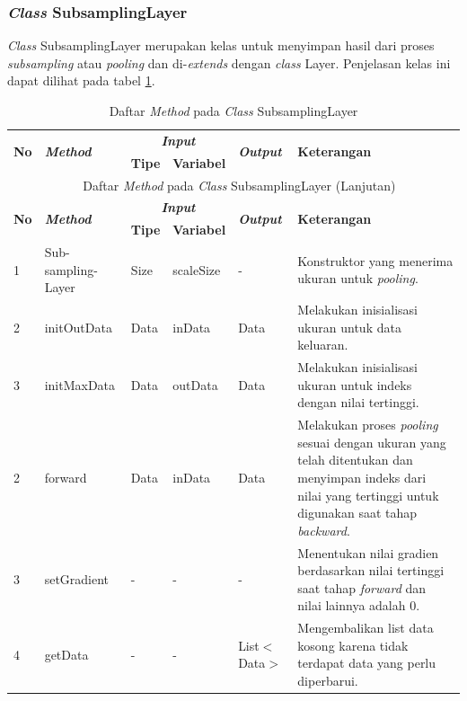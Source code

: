 \subsubsection{\textit{Class} SubsamplingLayer}
\noindent \textit{Class} SubsamplingLayer merupakan kelas untuk menyimpan hasil dari proses \textit{subsampling} atau \textit{pooling} dan di-\textit{extends} dengan \textit{class} Layer. Penjelasan kelas ini dapat dilihat pada tabel \ref{tbl:classSubsamplingLayer}.
\begingroup
\setlength{\LTleft}{-20cm plus -1fill}
\setlength{\LTright}{\LTleft}
\begin{small}
\begin{longtable}{|p{0.4cm}|p{2cm}|p{1.8cm}|p{1.8cm}|p{1.7cm}|p{3.55cm}|}
	\caption{Daftar \textit{Method} pada \textit{Class} SubsamplingLayer \label{tbl:classSubsamplingLayer}}\\
	\hline
	\multirow{2}{*}{\textbf{No}} & \multirow{2}{*}{\textit{\textbf{Method}}} & \multicolumn{2}{c|}{\textit{\textbf{Input}}} & \multirow{2}{*}{\textit{\textbf{Output}}} & 
	\multirow{2}{*}{\textbf{Keterangan}}\\
	\cline{3-4}
	& & \textbf{Tipe} & \textbf{Variabel} & & \\
	\endfirsthead
	\multicolumn{6}{c}{\textbf{\tablename~\thetable} Daftar \textit{Method} pada \textit{Class} SubsamplingLayer (Lanjutan)} \\
	\hline
	\multirow{2}{*}{\textbf{No}} & \multirow{2}{*}{\textit{\textbf{Method}}} & \multicolumn{2}{c|}{\textit{\textbf{Input}}} & \multirow{2}{*}{\textit{\textbf{Output}}} & 
	\multirow{2}{*}{\textbf{Keterangan}}\\
	\cline{3-4}
	& & \textbf{Tipe} & \textbf{Variabel} & & \\
	\endhead
	\hline
	1 & Sub-\newline sampling-\newline Layer & Size & scaleSize & - & Konstruktor yang menerima ukuran untuk \textit{pooling}.\\
	\hline
	2 & initOutData & Data & inData & Data & Melakukan inisialisasi ukuran untuk data keluaran.\\
	\hline
	3 & initMaxData & Data & outData & Data & Melakukan inisialisasi ukuran untuk indeks dengan nilai tertinggi.\\
	\hline
	2 & forward & Data & inData & Data & Melakukan proses \textit{pooling} sesuai dengan ukuran yang telah ditentukan dan menyimpan indeks dari nilai yang tertinggi untuk digunakan saat tahap \textit{backward}.\\
	\hline
	3 & setGradient & - & - & - & Menentukan nilai gradien berdasarkan nilai tertinggi saat tahap \textit{forward} dan nilai lainnya adalah 0.\\
	\hline
	4 & getData & - & - & List$<$Data$>$ & Mengembalikan list data kosong karena tidak terdapat data yang perlu diperbarui.\\
	\hline
\end{longtable}
\end{small}
\endgroup

